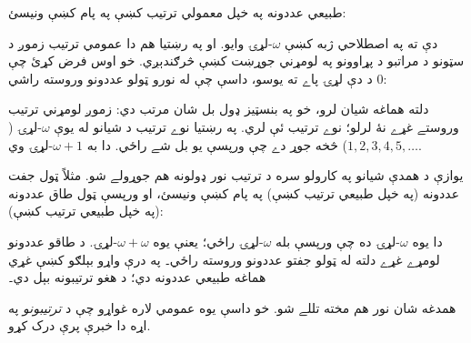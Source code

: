 \documentclass[../../../include/open-logic-section]{subfiles}
\begin{document}

طبيعي عددونه په خپل معمولي ترتيب کښې په پام کښې ونيسئ:
\begin{center}
\end{center}
دې ته په اصطلاحي ژبه کښې $\omega$-لړۍ وايو. او په رښتيا هم
دا عمومي ترتيب زموږ د سټونو د مراتبو د پړاوونو په لومړني جوړښت
کښې څرګندېږي. خو اوس فرض کړئ چې $0$ د دې لړۍ پاے ته يوسو،
داسې چې له نورو ټولو عددونو وروسته راشي:
\begin{center}
\end{center}
دلته هماغه شيان لرو، خو په بنسټيز ډول بل شان مرتب دي: زموږ
لومړني ترتيب وروستے غړے نۀ لرلو؛ نوے ترتيب ئې لري. په رښتيا
نوے ترتيب د شيانو له يوې $\omega$-لړۍ ($1, 2, 3, 4, 5, \ldots$)
څخه جوړ دے چې ورپسې يو بل شے راځي. دا به $\omega+1$-لړۍ وي.

يوازې د همدې شيانو په کارولو سره د ترتيب نور ډولونه هم جوړولے
شو. مثلاً ټول جفت عددونه (په خپل طبيعي ترتيب کښې) په پام کښې
ونيسئ، او ورپسې ټول طاق عددونه (په خپل طبيعي ترتيب کښې):
\begin{center}
\end{center}
دا يوه $\omega$-لړۍ ده چې ورپسې بله $\omega$-لړۍ راځي؛ يعنې
يوه $\omega+\omega$-لړۍ. د طاقو عددونو لومړے غړے دلته له
ټولو جفتو عددونو وروسته راځي۔ په درې واړو بېلګو کښې غړي
هماغه طبيعي عددونه دي؛ د هغو ترتيبونه بېل دي۔ 

همدغه شان نور هم مخته تللے شو. خو داسې يوه عمومي لاره غواړو
چې د \emph{ترتيبونو} په اړه دا خبرې پرې درک کړو. 
\end{document}
